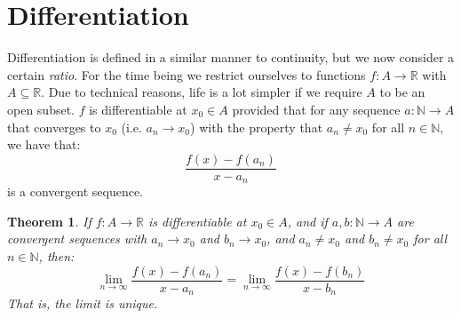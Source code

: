 \documentclass{article}
\theoremstyle{normal}
\newtheorem{theorem}{Theorem}
\begin{document}
    \section{Differentiation}
        Differentiation is defined in a similar manner to continuity, but
        we now consider a certain \textit{ratio}. For the time being we
        restrict ourselves to functions $f:A\rightarrow\mathbb{R}$ with
        $A\subseteq\mathbb{R}$. Due to technical reasons, life is a lot
        simpler if we require $A$ to be an open subset. $f$ is
        differentiable at $x_{0}\in{A}$ provided that for any sequence
        $a:\mathbb{N}\rightarrow{A}$ that converges to $x_{0}$
        (i.e. $a_{n}\rightarrow{x}_{0}$) with the property that
        $a_{n}\ne{x}_{0}$ for all $n\in\mathbb{N}$, we have that:
        \begin{equation}
            \frac{f(x)-f(a_{n})}{x-a_{n}}
        \end{equation}
        is a convergent sequence.
        \begin{theorem}
            If $f:A\rightarrow\mathbb{R}$ is differentiable at
            $x_{0}\in{A}$, and if $a,b:\mathbb{N}\rightarrow{A}$ are
            convergent sequences with $a_{n}\rightarrow{x}_{0}$ and
            $b_{n}\rightarrow{x}_{0}$, and $a_{n}\ne{x}_{0}$ and
            $b_{n}\ne{x}_{0}$ for all $n\in\mathbb{N}$, then:
            \begin{equation}
                \lim_{n\rightarrow\infty}
                \frac{f(x)-f(a_{n})}{x-a_{n}}
                =
                \lim_{n\rightarrow\infty}
                \frac{f(x)-f(b_{n})}{x-b_{n}}
            \end{equation}
            That is, the limit is unique.
        \end{theorem}
\end{document}
